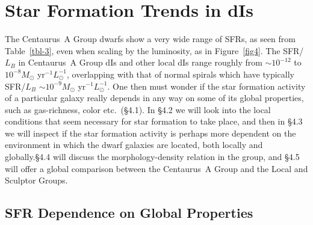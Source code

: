 \documentclass[preprint]{aastex}
\begin{document}
\section{Star Formation Trends in dIs}

The Centaurus~A Group dwarfs show a very wide range of SFRs,
as seen from Table~\ref{tbl-3}, even when scaling by the luminosity,
as in Figure~\ref{fig4}. The SFR/$L_B$ in Centaurus~A Group dIs and other
local dIs range roughly from $\sim 10^{-12}$ to $10^{-8} 
M_{\odot}$ yr$^{-1} L_{\odot}^{-1}$, overlapping with that of normal spirals
which have typically SFR/$L_B$ $\sim 10^{-9} M_{\odot}$ yr$^{-1} L_{\odot}^{-1}$.
One then must wonder if the star formation activity of a particular galaxy
really depends in any way on some of its global properties, such as
gas-richness, color etc.\ (\S 4.1). In \S 4.2 we will look into
the local conditions that seem necessary for star formation to take place,
and then in \S 4.3 we will inspect
if the star formation activity is perhaps more dependent on the
environment in which the dwarf galaxies are located, both locally and 
globally.\S 4.4 will discuss the morphology-density relation in the group,
and \S 4.5 will offer a global comparison between the Centaurus~A Group
and the Local and Sculptor Groups.

\subsection{SFR Dependence on Global Properties}
\end{document}
